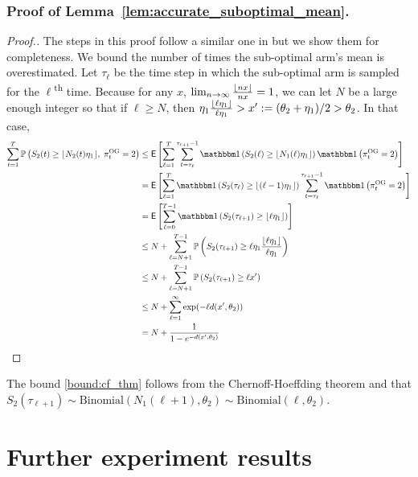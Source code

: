 \subsubsection{Proof of Lemma~\ref{lem:accurate_suboptimal_mean}.} \label{prf:proof_of_acc_sub_means}
\begin{proof}[Proof.]
	The steps in this proof follow a similar one in \cite{agrawal2013further} but we show them for completeness. We bound the number of times the sub-optimal arm's mean is overestimated. Let $\tau_\ell$ be the time step in which the  sub-optimal arm is sampled for the $\ell$\textsuperscript{th} time. Because for any $x$, $\lim_{n\to\infty}\frac{\lfloor nx\rfloor}{nx} = 1$, we can let $N$ be a large enough integer so that if $\ell \ge N$, then $\eta_1 \frac{\lfloor\ell \eta_1\rfloor}{\ell \eta_1} > x' := (\theta_2 + \eta_1)/2 > \theta_2$. In that case,
	\begin{align}
	\sum_{t=1}^T\P{S_2(t) \ge \floor{N_2(t) \eta_1}, \; \pi^{\rm OG}_t = 2} & \le \Ee{\sum_{\ell=1}^T \sum_{t=\tau_\ell}^{\tau_{\ell+1}-1}\ind{S_2(\ell) \ge \floor{N_1(\ell) \eta_1}} \ind{\pi^{\rm OG}_t = 2}} \nonumber \\
	& = \Ee{\sum_{\ell=1}^T \ind{S_2(\tau_{\ell}) \ge \floor{(\ell-1) \eta_1}} \sum_{t=\tau_\ell}^{\tau_{\ell+1}-1} \ind{\pi^{\rm OG}_t = 2}} \nonumber\\
	& = \Ee{\sum_{\ell=0}^{T-1} \ind{S_2(\tau_{\ell+1}) \ge \floor{\ell \eta_1}}} \nonumber\\
	& \le  N + \sum_{\ell=N+1}^{T-1} \P{ S_2(\tau_{\ell+1}) \ge \ell \eta_1 \frac{\floor{\ell \eta_1}}{\ell \eta_1}} \nonumber \\
	& \le N + \sum_{\ell=N+1}^{T-1} \P{ S_2(\tau_{\ell+1}) \ge \ell x'} \nonumber \\
	& \le  N + \sum_{\ell=1}^{\infty} \exp(-\ell d(x', \theta_2)) \label{bound:cf_thm} \\
	& = N + \frac{1}{1 - e^{-d(x',\theta_2)}} \nonumber
	\end{align}
\end{proof}
The bound \eqref{bound:cf_thm} follows from the Chernoff-Hoeffding theorem and that $S_2(\tau_{\ell+1}) \sim \text{Binomial}(N_1(\ell+1), \theta_2) \sim \text{Binomial}(\ell, \theta_2)$.

\section{Further experiment results} \label{sec:further_exp}
